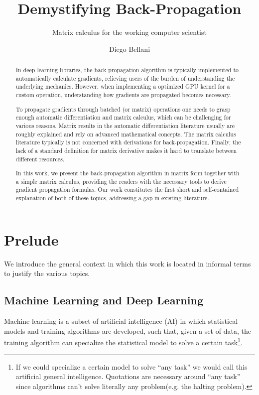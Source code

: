 \documentclass{sapthesis}
\title{Demystifying Back-Propagation}
\subtitle{Matrix calculus for the working computer scientist}
\author{Diego Bellani}
\begin{document}
\maketitle

\begin{abstract}
In deep learning libraries, the back-propagation algorithm is typically
implemented to automatically calculate gradients, relieving users of the burden
of understanding the underlying mechanics. However, when implementing a
optimized GPU kernel for a custom operation, understanding how gradients are
propagated becomes necessary.

To propagate gradients through batched (or matrix) operations one needs to grasp
enough automatic differentiation and matrix calculus, which can be challenging
for various reasons. Matrix results in the automatic differentiation literature
usually are roughly explained and rely on advanced mathematical concepts. The
matrix calculus literature typically is not concerned with derivations for
back-propagation. Finally, the lack of a standard definition for matrix
derivative makes it hard to translate between different resources.

In this work, we present the back-propagation algorithm in matrix form together
with a simple matrix calculus, providing the readers with the necessary tools to
derive gradient propagation formulas. Our work constitutes the first short and
self-contained explanation of both of these topics, addressing a gap in existing
literature.
\end{abstract}

\tableofcontents

\chapter{Prelude}

We introduce the general context in which this work is located in informal terms to
justify the various topics.

\section{Machine Learning and Deep Learning}

Machine learning is a subset of artificial intelligence (AI) in which
statistical models and training algorithms are developed, such that, given a set
of data, the training algorithm can specialize the statistical model to solve a
certain task\footnote{If we could specialize a certain model to solve ``any
task'' we would call this artificial general intelligence. Quotations are
necessary around ``any task'' since algorithms can't solve literally any
problem(e.g. the halting problem).}.
\end{document}
